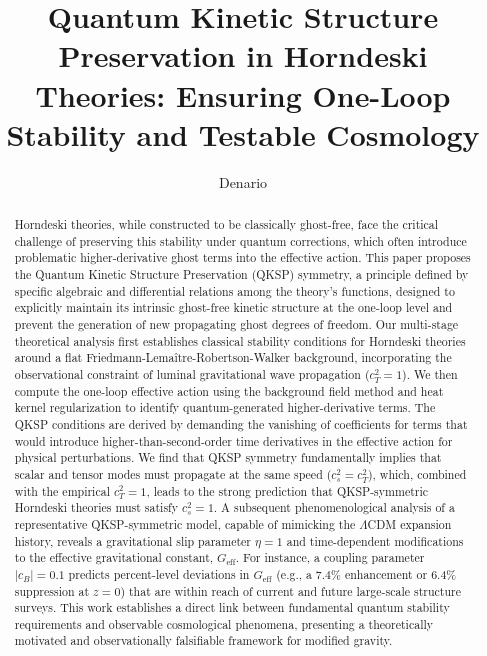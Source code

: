 \documentclass[twocolumn]{aastex631}
\begin{document}
\title{Quantum Kinetic Structure Preservation in Horndeski Theories: Ensuring One-Loop Stability and Testable Cosmology}

\author{Denario}

\begin{abstract}
Horndeski theories, while constructed to be classically ghost-free, face the critical challenge of preserving this stability under quantum corrections, which often introduce problematic higher-derivative ghost terms into the effective action. This paper proposes the Quantum Kinetic Structure Preservation (QKSP) symmetry, a principle defined by specific algebraic and differential relations among the theory's functions, designed to explicitly maintain its intrinsic ghost-free kinetic structure at the one-loop level and prevent the generation of new propagating ghost degrees of freedom. Our multi-stage theoretical analysis first establishes classical stability conditions for Horndeski theories around a flat Friedmann-Lemaître-Robertson-Walker background, incorporating the observational constraint of luminal gravitational wave propagation ($c_T^2=1$). We then compute the one-loop effective action using the background field method and heat kernel regularization to identify quantum-generated higher-derivative terms. The QKSP conditions are derived by demanding the vanishing of coefficients for terms that would introduce higher-than-second-order time derivatives in the effective action for physical perturbations. We find that QKSP symmetry fundamentally implies that scalar and tensor modes must propagate at the same speed ($c_s^2 = c_T^2$), which, combined with the empirical $c_T^2=1$, leads to the strong prediction that QKSP-symmetric Horndeski theories must satisfy $c_s^2=1$. A subsequent phenomenological analysis of a representative QKSP-symmetric model, capable of mimicking the $\Lambda$CDM expansion history, reveals a gravitational slip parameter $\eta=1$ and time-dependent modifications to the effective gravitational constant, $G_{\text{eff}}$. For instance, a coupling parameter $|c_B|=0.1$ predicts percent-level deviations in $G_{\text{eff}}$ (e.g., a 7.4\% enhancement or 6.4\% suppression at $z=0$) that are within reach of current and future large-scale structure surveys. This work establishes a direct link between fundamental quantum stability requirements and observable cosmological phenomena, presenting a theoretically motivated and observationally falsifiable framework for modified gravity.
\end{abstract}
\end{document}
